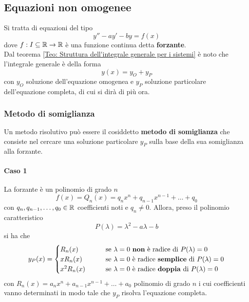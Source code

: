 \subsection{Equazioni non omogenee}
Si tratta di equazioni del tipo
\begin{equation}
    y'' - ay'-by=f(x)
\end{equation}
dove $f:I \subseteq \mathbb{R} \to \mathbb{R}$ è una funzione continua detta \textbf{forzante}.\\
Dal teorema \ref{Teo: Struttura dell'integrale generale per i sistemi} è noto che l'integrale generale è della forma 
\begin{equation}
    y(x)= y_{O}+ y_{P}
\end{equation}
con $y_{O}$ soluzione dell'equazione omogenea e $y_{P}$ soluzione particolare dell'equazione completa, di cui si dirà di più ora.
\subsubsection{Metodo di somiglianza}
Un metodo risolutivo può essere il cosiddetto \textbf{metodo di somiglianza} che consiste nel cercare una soluzione particolare $y_P$ sulla base della sua somiglianza alla forzante.
\paragraph{Caso 1} La forzante è un polinomio di grado $n$
\begin{equation}
    f(x)=Q_n(x)= q_nx^n+q_{n-1}x^{n-1}+ \dots +q_0
\end{equation}
con $q_n, q_{n-1}, \dots, q_0 \in \mathbb{R}$ coefficienti noti e $q_n \neq 0$.
Allora, preso il polinomio caratteristico
\begin{equation}
    P(\lambda)=\lambda^2 - a\lambda-b
\end{equation}
si ha che
\begin{equation}
    y_P(x)=\begin{cases}
        R_n(x) &\qquad \text{se}\ \lambda=0\ \text{\textbf{non} è radice di}\ P(\lambda)=0\\
        xR_n(x) &\qquad \text{se}\ \lambda=0\ \text{è radice \textbf{semplice} di}\ P(\lambda)=0\\
        x^2R_n(x) &\qquad \text{se}\ \lambda=0\ \text{è radice \textbf{doppia} di}\ P(\lambda)=0\\
    \end{cases}
\end{equation}
con $R_n(x)=a_nx^n+ a_{n-1}x^{n-1}+\dots+a_0$ polinomio di grado $n$ i cui coefficienti vanno determinati in modo tale che $y_P$ risolva l'equazione completa.
